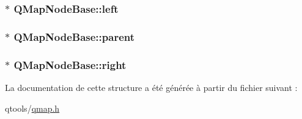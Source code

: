 \subsubsection[{left}]{$\ast$ Q\+Map\+Node\+Base\+::left}\label{struct_q_map_node_base_a5334085d1e9ededc044ea0b5551ed7fd}
\hypertarget{struct_q_map_node_base_a681ee5099626a90f1ecb5ae13ac168fd}{}
\subsubsection[{parent}]{$\ast$ Q\+Map\+Node\+Base\+::parent}\label{struct_q_map_node_base_a681ee5099626a90f1ecb5ae13ac168fd}
\hypertarget{struct_q_map_node_base_a8eae5d979c668347872c31b956626a68}{}
\subsubsection[{right}]{$\ast$ Q\+Map\+Node\+Base\+::right}\label{struct_q_map_node_base_a8eae5d979c668347872c31b956626a68}


La documentation de cette structure a été générée à partir du fichier suivant \+:\begin{DoxyCompactItemize}
\item 
qtools/\hyperlink{qmap_8h}{qmap.\+h}\end{DoxyCompactItemize}
